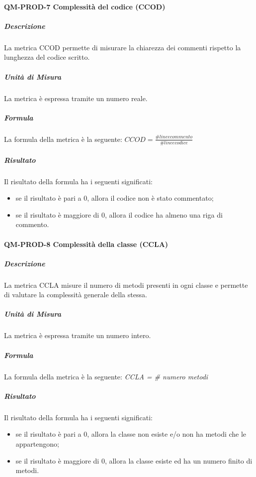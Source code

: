 			\paragraph{QM-PROD-7 Complessità del codice (CCOD)}
				\subparagraph{Descrizione}
					La metrica CCOD permette di misurare la chiarezza dei commenti rispetto la lunghezza del codice scritto.
				\subparagraph{Unità di Misura}
					La metrica è espressa tramite un numero reale.
				\subparagraph{Formula}
					La formula della metrica è la seguente:
				 \(
				 		CCOD = \frac{\# linee commento}{\# linee codice}
				 \)
				\subparagraph{Risultato}
					Il risultato della formula ha i seguenti significati:
					\begin{itemize}
						\item se il risultato è pari a 0, allora il codice non è stato commentato;
						\item se il risultato è maggiore di 0, allora il codice ha almeno una riga di commento.
					\end{itemize}
			\paragraph{QM-PROD-8 Complessità della classe (CCLA)}
				\subparagraph{Descrizione}
					La metrica CCLA misure il numero di metodi presenti in ogni classe e permette di valutare la complessità generale della stessa.
				\subparagraph{Unità di Misura}
					La metrica è espressa tramite un numero intero.
				\subparagraph{Formula}
					La formula della metrica è la seguente:
					\textit{CCLA = \# numero metodi}
				\subparagraph{Risultato}
					Il risultato della formula ha i seguenti significati:
					\begin{itemize}
						\item se il risultato è pari a 0, allora la classe non esiste e/o non ha metodi che le appartengono;
						\item se il risultato è maggiore di 0, allora la classe esiste ed ha un numero finito di metodi.
					\end{itemize}
